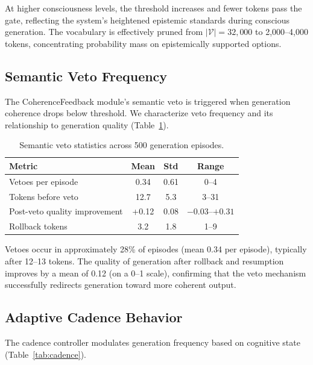 \documentclass[12pt,a4paper]{article}
\begin{document}
At higher consciousness levels, the threshold increases and fewer tokens pass the gate, reflecting the system's heightened epistemic standards during conscious generation. The vocabulary is effectively pruned from $|\mathcal{V}| = 32{,}000$ to 2,000--4,000 tokens, concentrating probability mass on epistemically supported options.

\subsection{Semantic Veto Frequency}

The CoherenceFeedback module's semantic veto is triggered when generation coherence drops below threshold. We characterize veto frequency and its relationship to generation quality (Table~\ref{tab:veto}).

\begin{table}[H]
\centering
\caption{Semantic veto statistics across 500 generation episodes.}
\label{tab:veto}
\begin{tabular}{lccc}
\toprule
\textbf{Metric} & \textbf{Mean} & \textbf{Std} & \textbf{Range} \\
\midrule
Vetoes per episode & 0.34 & 0.61 & 0--4 \\
Tokens before veto & 12.7 & 5.3 & 3--31 \\
Post-veto quality improvement & +0.12 & 0.08 & $-0.03$--$+0.31$ \\
Rollback tokens & 3.2 & 1.8 & 1--9 \\
\bottomrule
\end{tabular}
\end{table}

Vetoes occur in approximately 28\% of episodes (mean 0.34 per episode), typically after 12--13 tokens. The quality of generation after rollback and resumption improves by a mean of 0.12 (on a 0--1 scale), confirming that the veto mechanism successfully redirects generation toward more coherent output.

\subsection{Adaptive Cadence Behavior}

The cadence controller modulates generation frequency based on cognitive state (Table~\ref{tab:cadence}).
\end{document}
